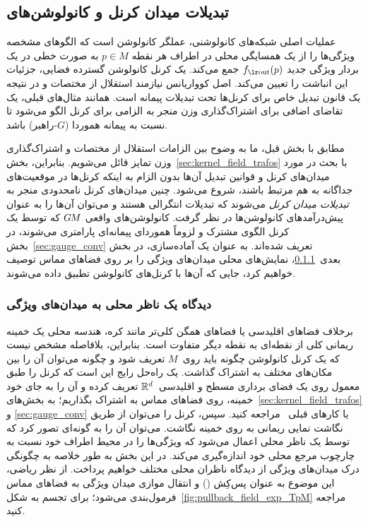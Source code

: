 
\subsection{تبدیلات میدان کرنل و کانولوشن‌های }
\label{sec:gauge_conv_main}


عملیات اصلی شبکه‌های کانولوشنی، عملگر کانولوشن است که الگوهای مشخصه ویژگی‌ها را از یک همسایگی محلی در اطراف هر نقطه $p\in M$ به صورت خطی در یک بردار ویژگی جدید $\fout(p)$ جمع می‌کند.
یک کرنل کانولوشن گسترده فضایی، جزئیات این انباشت را تعیین می‌کند.
اصل کوواریانس نیازمند استقلال از مختصات و در نتیجه یک قانون تبدیل خاص برای کرنل‌ها تحت تبدیلات پیمانه است.
همانند مثال‌های قبلی، یک تقاضای اضافی برای اشتراک‌گذاری وزن منجر به الزامی برای کرنل الگو می‌شود تا نسبت به پیمانه هموردا ($G$-راهبر) باشد.

مطابق با بخش قبل، ما به وضوح بین الزامات استقلال از مختصات و اشتراک‌گذاری وزن تمایز قائل می‌شویم.
بنابراین، بخش~\ref{sec:kernel_field_trafos} با بحث در مورد میدان‌های کرنل و قوانین تبدیل آن‌ها بدون الزام به اینکه کرنل‌ها در موقعیت‌های جداگانه به هم مرتبط باشند، شروع می‌شود.
چنین میدان‌های کرنل نامحدودی منجر به \emph{تبدیلات میدان کرنل} می‌شوند که تبدیلات انتگرالی هستند و می‌توان آن‌ها را به عنوان پیش‌درآمدهای کانولوشن‌ها در نظر گرفت.
کانولوشن‌های واقعی $G\mkern-1.4muM$ که توسط یک کرنل الگوی مشترک و لزوماً هموردای پیمانه‌ای پارامتری می‌شوند، در بخش~\ref{sec:gauge_conv} تعریف شده‌اند.
به عنوان یک آماده‌سازی، در بخش بعدی~\ref{sec:observers_view}، نمایش‌های محلی میدان‌های ویژگی را بر روی فضاهای مماس توصیف خواهیم کرد، جایی که آن‌ها با کرنل‌های کانولوشن تطبیق داده می‌شوند.

\subsubsection{دیدگاه یک ناظر محلی به میدان‌های ویژگی}
\label{sec:observers_view}

برخلاف فضاهای اقلیدسی یا فضاهای همگن کلی‌تر مانند کره، هندسه محلی یک خمینه ریمانی کلی از نقطه‌ای به نقطه دیگر متفاوت است.
بنابراین، بلافاصله مشخص نیست که یک کرنل کانولوشن چگونه باید روی~$M$ تعریف شود و چگونه می‌توان آن را بین مکان‌های مختلف به اشتراک گذاشت.
یک راه‌حل رایج این است که کرنل را طبق معمول روی یک فضای برداری مسطح و اقلیدسی~$\mathbb{R}^d$ تعریف کرده و آن را به جای خود خمینه، روی فضاهای مماس به اشتراک بگذاریم؛
به بخش‌های~\ref{sec:kernel_field_trafos} و \ref{sec:gauge_conv} یا کارهای قبلی~%
\cite{masci2015geodesic,poulenard2018multi,sun2018zernet,coors2018spherenet,gaugeIco2019,Wiersma2020,deHaan2020meshCNNs,Yang2020parallelFrameCNN} مراجعه کنید.
سپس، کرنل را می‌توان از طریق نگاشت نمایی ریمانی به روی خمینه نگاشت.
می‌توان آن را به گونه‌ای تصور کرد که توسط یک ناظر محلی اعمال می‌شود که ویژگی‌ها را در محیط اطراف خود نسبت به چارچوب مرجع محلی خود اندازه‌گیری می‌کند.
در این بخش به طور خلاصه به چگونگی درک میدان‌های ویژگی از دیدگاه ناظران محلی مختلف خواهیم پرداخت.
از نظر ریاضی، این موضوع به عنوان پس‌کِش () و انتقال موازی میدان ویژگی به فضاهای مماس فرمول‌بندی می‌شود؛ برای تجسم به شکل~\ref{fig:pullback_field_exp_TpM} مراجعه کنید.

